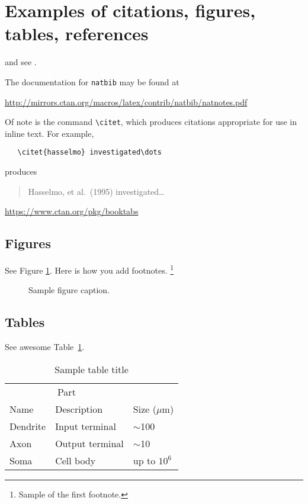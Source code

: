 \documentclass{article}
\begin{document}
\section{Examples of citations, figures, tables, references}
\label{sec:others}
\lipsum[8] \cite{kour2014real,kour2014fast} and see \cite{hadash2018estimate}.

The documentation for \verb+natbib+ may be found at
\begin{center}
  \url{http://mirrors.ctan.org/macros/latex/contrib/natbib/natnotes.pdf}
\end{center}
Of note is the command \verb+\citet+, which produces citations
appropriate for use in inline text.  For example,
\begin{verbatim}
   \citet{hasselmo} investigated\dots
\end{verbatim}
produces
\begin{quote}
  Hasselmo, et al.\ (1995) investigated\dots
\end{quote}

\begin{center}
  \url{https://www.ctan.org/pkg/booktabs}
\end{center}


\subsection{Figures}
\lipsum[10] 
See Figure \ref{fig:fig1}. Here is how you add footnotes. \footnote{Sample of the first footnote.}
\lipsum[11] 

\begin{figure}[h]
  \centering
  \fbox{\rule[-.5cm]{4cm}{4cm} \rule[-.5cm]{4cm}{0cm}}
  \caption{Sample figure caption.}
  \label{fig:fig1}
\end{figure}

\subsection{Tables}
\lipsum[12]
See awesome Table~\ref{tab:table}.

\begin{table}
 \caption{Sample table title}
  \centering
  \begin{tabular}{lll}
    \toprule
    \multicolumn{2}{c}{Part}                   \\
    \cmidrule(r){1-2}
    Name     & Description     & Size ($\mu$m) \\
    \midrule
    Dendrite & Input terminal  & $\sim$100     \\
    Axon     & Output terminal & $\sim$10      \\
    Soma     & Cell body       & up to $10^6$  \\
    \bottomrule
  \end{tabular}
  \label{tab:table}
\end{table}
\end{document}
